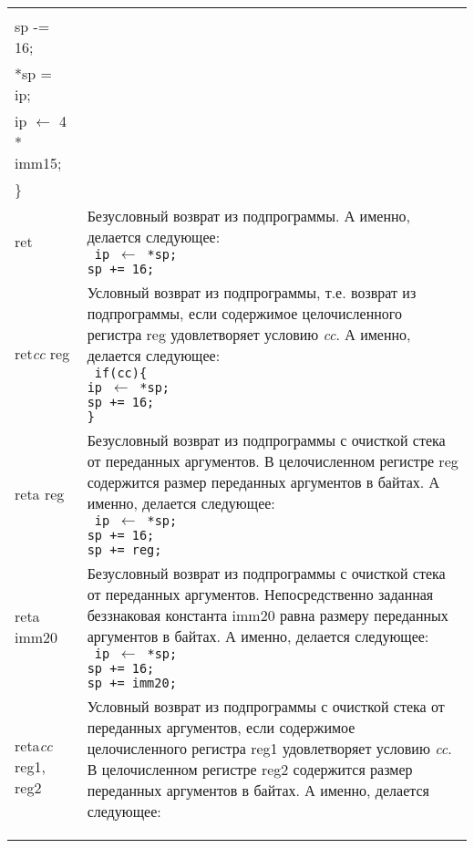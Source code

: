\documentclass[10pt]{report}
\begin{document}
\begin{longtable}[c]{|l|p{12.5cm}|}
{{\texttt{%
if(cc)\{\\
\phantom{aaaa}sp -= 16;\\
\phantom{aaaa}*sp = ip;\\
\phantom{aaaa}ip $\leftarrow$ 4 * imm15;\\
\}
}
}} \\ \hline
ret                           & {\parbox{12.4cm}{Безусловный возврат из подпрограммы. А именно, делается следующее:\\ %
\texttt{%
\phantom{aaaa}ip $\leftarrow$ *sp;\\
\phantom{aaaa}sp += 16;
}
}} \\ \hline
ret\textit{cc} reg            & {\parbox{12.4cm}{Условный возврат из подпрограммы, т.е. возврат из подпрограммы, если содержимое целочисленного регистра reg удовлетворяет условию \textit{cc}. А именно, делается следующее:\\ %
\texttt{%
if(cc)\{\\
\phantom{aaaa}ip $\leftarrow$ *sp;\\
\phantom{aaaa}sp += 16;\\
\}
}
}} \\ \hline
reta reg                     & {\parbox{12.4cm}{Безусловный возврат из подпрограммы с очисткой стека от переданных аргументов. В целочисленном регистре reg содержится размер переданных аргументов в байтах. А именно, делается следующее:\\ %
\texttt{%
\phantom{aaaa}ip $\leftarrow$ *sp;\\
\phantom{aaaa}sp += 16;\\
\phantom{aaaa}sp += reg;
}
}} \\ \hline
reta imm20                   & {\parbox{12.4cm}{Безусловный возврат из подпрограммы с очисткой стека от переданных аргументов. Непосредственно заданная беззнаковая константа imm20 равна размеру переданных аргументов в байтах. А именно, делается следующее:\\ %
\texttt{%
\phantom{aaaa}ip $\leftarrow$ *sp;\\
\phantom{aaaa}sp += 16;\\
\phantom{aaaa}sp += imm20;
}
}} \\ \hline
reta\textit{cc} reg1, reg2   & {\parbox{12.4cm}{Условный возврат из подпрограммы с очисткой стека от переданных аргументов, если содержимое целочисленного регистра reg1 удовлетворяет условию \textit{cc}. В целочисленном регистре reg2 содержится размер переданных аргументов в байтах. А именно, делается следующее:\\ %
\texttt{%
}}}
\end{longtable}
\end{document}
